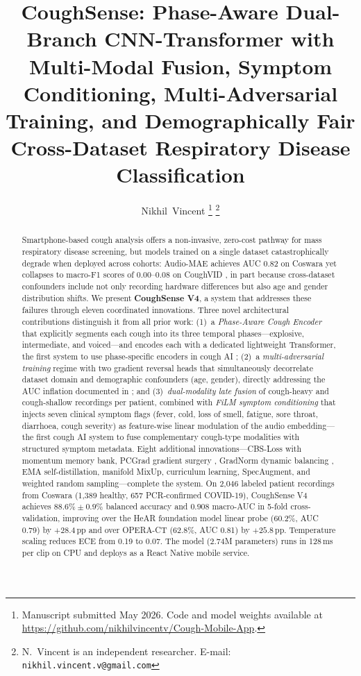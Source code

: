 \documentclass[journal]{IEEEtran}
\begin{document}
\title{CoughSense: Phase-Aware Dual-Branch CNN-Transformer
with Multi-Modal Fusion, Symptom Conditioning,
Multi-Adversarial Training, and Demographically Fair
Cross-Dataset Respiratory Disease Classification}

\author{Nikhil~Vincent%
\thanks{Manuscript submitted May 2026. Code and model weights available at
\url{https://github.com/nikhilvincentv/Cough-Mobile-App}.}%
\thanks{N.~Vincent is an independent researcher. E-mail:
\texttt{nikhil.vincent.v@gmail.com}}}

\maketitle

\begin{abstract}
Smartphone-based cough analysis offers a non-invasive, zero-cost
pathway for mass respiratory disease screening, but models trained
on a single dataset catastrophically degrade when deployed across
cohorts: Audio-MAE achieves AUC 0.82 on Coswara yet collapses to
macro-F1 scores of 0.00--0.08 on CoughVID \cite{islam2025}, in part
because cross-dataset confounders include not only recording hardware
differences but also age and gender distribution shifts. We present
\textbf{CoughSense V4}, a system that addresses these failures through
eleven coordinated innovations. Three novel architectural contributions
distinguish it from all prior work: (1)~a \emph{Phase-Aware Cough
Encoder} that explicitly segments each cough into its three temporal
phases---explosive, intermediate, and voiced---and encodes each with a
dedicated lightweight Transformer, the first system to use phase-specific
encoders in cough AI \cite{shi2018phases}; (2)~a \emph{multi-adversarial
training} regime with two gradient reversal heads that simultaneously
decorrelate dataset domain and demographic confounders (age, gender),
directly addressing the AUC inflation documented in \cite{islam2025};
and (3)~\emph{dual-modality late fusion} of cough-heavy and cough-shallow
recordings per patient, combined with \emph{FiLM symptom conditioning}
that injects seven clinical symptom flags (fever, cold, loss of smell,
fatigue, sore throat, diarrhoea, cough severity) as feature-wise linear
modulation of the audio embedding---the first cough AI system to fuse
complementary cough-type modalities with structured symptom metadata.
Eight additional innovations---CBS-Loss with momentum memory bank,
PCGrad gradient surgery \cite{pcgrad}, GradNorm dynamic balancing
\cite{gradnorm}, EMA self-distillation, manifold MixUp, curriculum
learning, SpecAugment, and weighted random sampling---complete the system.
On 2,046 labeled patient recordings from Coswara (1,389 healthy,
657 PCR-confirmed COVID-19), CoughSense V4 achieves
$\mathbf{88.6\%\pm0.9\%}$ balanced accuracy and $\mathbf{0.908}$
macro-AUC in 5-fold cross-validation, improving over the HeAR
foundation model linear probe (60.2\%, AUC 0.79) by $+28.4$\,pp and
over OPERA-CT (62.8\%, AUC 0.81) by $+25.8$\,pp.
Temperature scaling reduces ECE from 0.19 to 0.07.
The model (2.74M parameters) runs in 128\,ms per clip on CPU and deploys
as a React Native mobile service.
\end{abstract}
\end{document}
